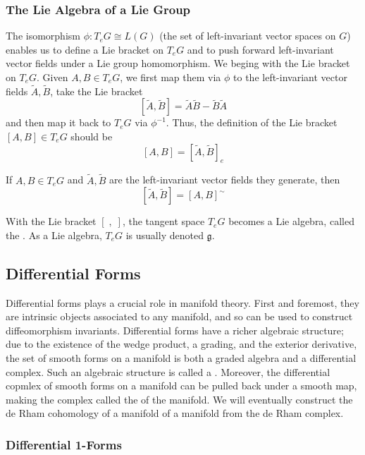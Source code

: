 \subsubsection{The Lie Algebra of a Lie Group}

The isomorphism \(\phi \colon T_e G \cong L(G)\) (the set of left-invariant vector spaces on \(G\)) enables us to define a Lie bracket on \(T_e G\) and to push forward left-invariant vector fields under a Lie group homomorphism.
We beging with the Lie bracket on \(T_e G\). 
Given \(A,B \in T_e G\), we first map them via \(\phi\) to the left-invariant vector fields \(\tilde{A}, \tilde{B}\), take the Lie bracket 
\[
    [\tilde{A}, \tilde{B}] = \tilde{A}\tilde{B} - \tilde{B}\tilde{A}
\]
and then map it back to \(T_e G\) via \(\phi^{-1}\).
Thus, the definition of the Lie bracket \([A,B] \in T_e G\) should be 
\[
    [A,B] = [\tilde{A}, \tilde{B}]_e
\]
\begin{proposition}{}{}
    If \(A,B \in T_e G\) and \(\tilde{A}, \tilde{B}\) are the left-invariant vector fields they generate, then 
    \[
        [\tilde{A}, \tilde{B}] = [A,B]^{\sim}
    \]
\end{proposition}

With the Lie bracket \([\;,\;]\), the tangent space \(T_e G\) becomes a Lie algebra, called the .
As a Lie algebra, \(T_e G\) is usually denoted \(\mathfrak{g}\).

\subsection{Differential Forms}

Differential forms plays a crucial role in manifold theory.
First and foremost, they are intrinsic objects associated to any manifold, and so can be used to construct diffeomorphism invariants.
Differential forms have a richer algebraic structure; due to the existence of the wedge product, a grading, and the exterior derivative, the set of smooth forms on a manifold is both a graded algebra and a differential complex.
Such an algebraic structure is called a .
Moreover, the differential copmlex of smooth forms on a manifold can be pulled back under a smooth map, making the complex  called the  of the manifold.
We will eventually construct the de Rham cohomology of a manifold of a manifold from the de Rham complex.

\subsubsection{Differential 1-Forms}

